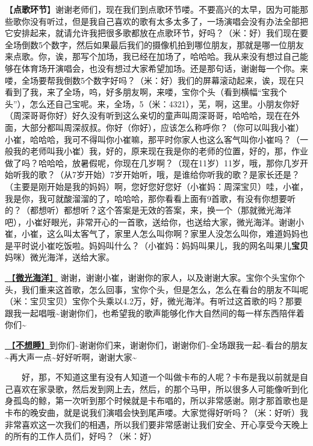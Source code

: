 \documentclass[]{ctexbook}
\begin{document}
【\textbf{点歌环节}】谢谢老师们，现在我们到点歌环节喽。不要高兴的太早，因为可能那些歌你没有听过，但是我自己喜欢的歌有太多太多了，一场演唱会没有办法全部把它安排起来，就请允许我把很多歌都放在点歌环节，好吗？（米：好）我们现在要全场倒数5个数字，然后如果最后我们的摄像机拍到哪位朋友，那就是哪一位朋友来点歌。你，诶，那写个加场，我已经在加场了，哈哈哈。我从来没有想过自己能够在体育场开演唱会，也没有想过大家希望加场。还是那句话，谢谢每一个你。来喽，全场要帮我倒数5个数字好吗？（米：好）我们的屏幕滚动起来，诶，现在只看到了我，来了全场，呜，好多朋友啊，来喽，宝你个头（看到横幅``宝我个头''），怎么还自己宝呢。来，全场，5（米：4321），芜，啊，这里。小朋友你好（周深哥哥你好）好久没有听到这么亲切的童声叫周深哥哥，哈哈哈，现在在外面，大部分都叫周深叔叔。你好（你好），应该怎么称呼你？（你可以叫我小崔）小崔，哈哈哈，我可不得叫你小崔嘛，那平时你家人也这么客气叫你小崔吗？（一般我的老师叫我小崔）我，好的，原来现在我是你的老师的位置，好的，那，作业做了吗？哈哈哈，放暑假呢，你现在几岁啊？（现在11岁）11岁，哦，那你几岁开始听我的歌？（从7岁开始）7岁开始听，哦，是谁给你听我的歌？是家长还是？（主要是刚开始是我的妈妈）啊，您好您好您好（小崔妈：周深宝贝）哇，小崔，我是你，我可就酸溜溜的了，哈哈哈，那你看看上面有9首歌，有没有你想要听的？（都想听）都想听？这个答案是无效的答案，来，换一个（那就微光海洋吧），小崔好眼光，非常开心的一首歌，送给你，也送给大家，微光海洋。谢谢小崔，小崔，这么叫太客气了，家里人怎么叫你啊？家里人没怎么叫你，难道妈妈也是平时说小崔吃饭啦。妈妈叫什么？（小崔妈：妈妈叫果儿，我的网名叫果儿\textbf{宝贝}妈咪）微光海洋，送给大家。

\hyperref[sea-of-shimmer]{🎵【\textbf{微光海洋}】} 谢谢，谢谢小崔，谢谢你的家人，以及谢谢大家。宝你个头宝你个头，我们重来这首歌，怎么回事，宝你个头，但是怎么，怎么在看台的朋友不叫呢（米：宝贝宝贝）宝你个头乘以4.2万，好，微光海洋。有听过这首歌的吗？那要跟我一起唱哦\textasciitilde 谢谢你们，也希望我的歌声能够化作大自然间的每一样东西陪伴着你们\textasciitilde{}

\hyperref[keep-playing]{🎵【\textbf{不想睡}】}到你们\textasciitilde 谢谢你们来，谢谢你们，谢谢你们\textasciitilde 全场跟我一起\textasciitilde 看台的朋友\textasciitilde 再大声一点\textasciitilde 好好听啊，谢谢大家\textasciitilde{}

  好，那，不知道这里有没有人知道一个叫做卡布的人呢？卡布是我以前就是自己喜欢在家录歌，然后发到网上去，然后，的那个马甲，所以很多人可能像听到化身孤岛的鲸，第一次听到那个时候就是卡布唱的，所以非常感谢。刚才那首歌也是卡布的晚安曲，就是说我们演唱会快到尾声喽。大家觉得好听吗？（米：好听）我非常喜欢这一次我们的相遇，所以我们要非常感谢让我们安全、开心享受今天晚上的所有的工作人员们，好吗？（米：好）
\end{document}
